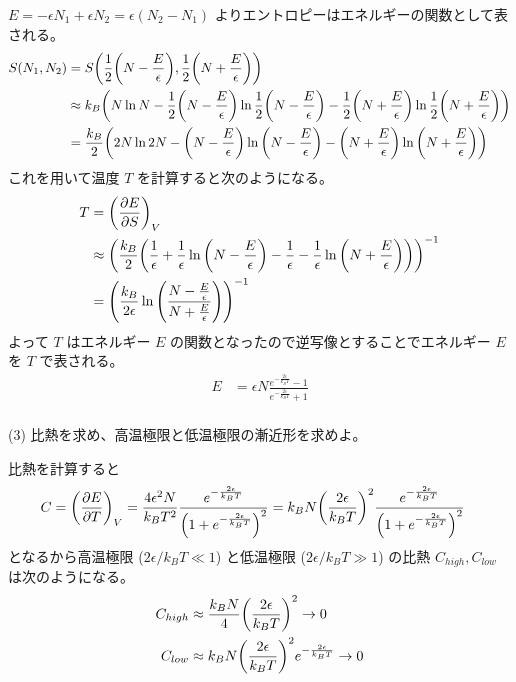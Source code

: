 \documentclass[uplatex,a4paper,dvipdfmx]{jsarticle}
\theoremstyle{definition}
\begin{document}
$E = -\epsilon N_1 + \epsilon N_2 = \epsilon (N_2 - N_1)$ よりエントロピーはエネルギーの関数として表される。
\begin{align}
  S(N_1, N_2) & = S\qty(\frac{1}{2}\qty(N - \frac{E}{\epsilon}), \frac{1}{2}\qty(N + \frac{E}{\epsilon}))                                                                                                         \\
              & \approx k_B\qty(N\ln N - \frac{1}{2}\qty(N - \frac{E}{\epsilon})\ln \frac{1}{2}\qty(N - \frac{E}{\epsilon}) - \frac{1}{2}\qty(N + \frac{E}{\epsilon})\ln \frac{1}{2}\qty(N + \frac{E}{\epsilon})) \\
              & = \frac{k_B}{2}\qty(2N\ln 2N - \qty(N - \frac{E}{\epsilon})\ln\qty(N - \frac{E}{\epsilon}) - \qty(N + \frac{E}{\epsilon})\ln\qty(N + \frac{E}{\epsilon}))
\end{align}
これを用いて温度 $T$ を計算すると次のようになる。
\begin{align}
  T & = \qty(\pdv{E}{S})_V                                                                                                                                                                  \\
    & \approx \qty(\frac{k_B}{2}\qty(\frac{1}{\epsilon} + \frac{1}{\epsilon}\ln\qty(N - \frac{E}{\epsilon}) - \frac{1}{\epsilon} - \frac{1}{\epsilon}\ln\qty(N + \frac{E}{\epsilon})))^{-1} \\
    & = \qty(\frac{k_B}{2\epsilon}\ln\qty(\frac{N - \frac{E}{\epsilon}}{N + \frac{E}{\epsilon}}))^{-1}
\end{align}
よって $T$ はエネルギー $E$ の関数となったので逆写像とすることでエネルギー $E$ を $T$ で表される。
\begin{align}
  E & = \epsilon N\frac{e^{-\frac{2\epsilon}{k_BT}} - 1}{e^{-\frac{2\epsilon}{k_BT}} + 1}
\end{align} \\

(3) 比熱を求め、高温極限と低温極限の漸近形を求めよ。

比熱を計算すると
\begin{align}
  C & = \qty(\pdv{E}{T})_V = \frac{4\epsilon^2N}{k_BT^2}\frac{e^{-\frac{2\epsilon}{k_BT}}}{\qty(1 + e^{-\frac{2\epsilon}{k_BT}})^2} = k_BN\qty(\frac{2\epsilon}{k_BT})^2\frac{e^{-\frac{2\epsilon}{k_BT}}}{\qty(1 + e^{-\frac{2\epsilon}{k_BT}})^2}
\end{align}
となるから高温極限 ($2\epsilon/k_BT \ll 1$) と低温極限 ($2\epsilon/k_BT \gg 1$) の比熱 $C_{high}, C_{low}$ は次のようになる。
\begin{align}
  C_{high} & \approx \frac{k_BN}{4}\qty(\frac{2\epsilon}{k_BT})^2 \to 0                  \\
  C_{low}  & \approx k_BN\qty(\frac{2\epsilon}{k_BT})^2e^{-\frac{2\epsilon}{k_BT}} \to 0
\end{align}
\end{document}
